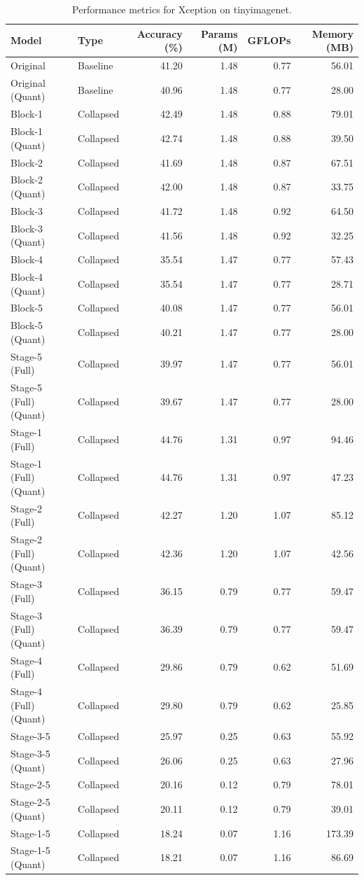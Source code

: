 \begin{table}
\caption{Performance metrics for Xception on tinyimagenet.}
\label{tab:Xception_tinyimagenet}
\begin{tabular}{llrrrr}
\toprule
Model & Type & Accuracy (\%) & Params (M) & GFLOPs & Memory (MB) \\
\midrule
Original & Baseline & 41.20 & 1.48 & 0.77 & 56.01 \\
Original
(Quant) & Baseline & 40.96 & 1.48 & 0.77 & 28.00 \\
Block-1 & Collapsed & 42.49 & 1.48 & 0.88 & 79.01 \\
Block-1
(Quant) & Collapsed & 42.74 & 1.48 & 0.88 & 39.50 \\
Block-2 & Collapsed & 41.69 & 1.48 & 0.87 & 67.51 \\
Block-2
(Quant) & Collapsed & 42.00 & 1.48 & 0.87 & 33.75 \\
Block-3 & Collapsed & 41.72 & 1.48 & 0.92 & 64.50 \\
Block-3
(Quant) & Collapsed & 41.56 & 1.48 & 0.92 & 32.25 \\
Block-4 & Collapsed & 35.54 & 1.47 & 0.77 & 57.43 \\
Block-4
(Quant) & Collapsed & 35.54 & 1.47 & 0.77 & 28.71 \\
Block-5 & Collapsed & 40.08 & 1.47 & 0.77 & 56.01 \\
Block-5
(Quant) & Collapsed & 40.21 & 1.47 & 0.77 & 28.00 \\
Stage-5 (Full) & Collapsed & 39.97 & 1.47 & 0.77 & 56.01 \\
Stage-5 (Full)
(Quant) & Collapsed & 39.67 & 1.47 & 0.77 & 28.00 \\
Stage-1 (Full) & Collapsed & 44.76 & 1.31 & 0.97 & 94.46 \\
Stage-1 (Full)
(Quant) & Collapsed & 44.76 & 1.31 & 0.97 & 47.23 \\
Stage-2 (Full) & Collapsed & 42.27 & 1.20 & 1.07 & 85.12 \\
Stage-2 (Full)
(Quant) & Collapsed & 42.36 & 1.20 & 1.07 & 42.56 \\
Stage-3 (Full) & Collapsed & 36.15 & 0.79 & 0.77 & 59.47 \\
Stage-3 (Full)
(Quant) & Collapsed & 36.39 & 0.79 & 0.77 & 59.47 \\
Stage-4 (Full) & Collapsed & 29.86 & 0.79 & 0.62 & 51.69 \\
Stage-4 (Full)
(Quant) & Collapsed & 29.80 & 0.79 & 0.62 & 25.85 \\
Stage-3-5 & Collapsed & 25.97 & 0.25 & 0.63 & 55.92 \\
Stage-3-5
(Quant) & Collapsed & 26.06 & 0.25 & 0.63 & 27.96 \\
Stage-2-5 & Collapsed & 20.16 & 0.12 & 0.79 & 78.01 \\
Stage-2-5
(Quant) & Collapsed & 20.11 & 0.12 & 0.79 & 39.01 \\
Stage-1-5 & Collapsed & 18.24 & 0.07 & 1.16 & 173.39 \\
Stage-1-5
(Quant) & Collapsed & 18.21 & 0.07 & 1.16 & 86.69 \\
\bottomrule
\end{tabular}
\end{table}
